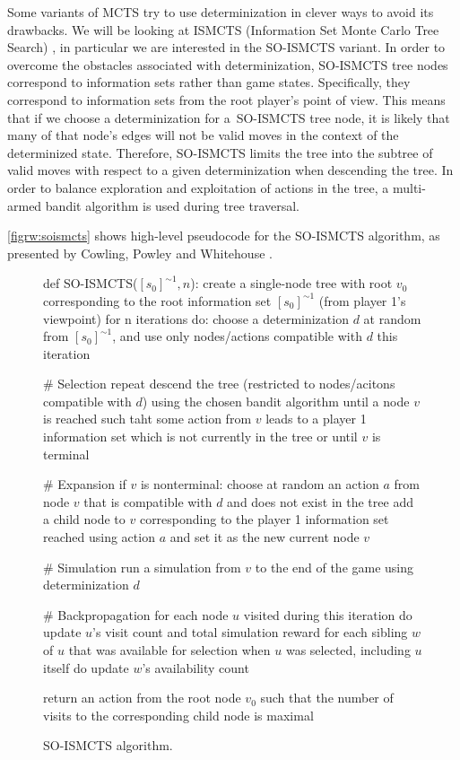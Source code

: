 Some variants of MCTS try to use determinization in clever ways to avoid its drawbacks.
We will be looking at ISMCTS (Information Set Monte Carlo Tree Search)
\cite{Cowling12}, in particular we are interested in the SO-ISMCTS variant.
In order to overcome the obstacles associated with determinization, SO-ISMCTS
tree nodes correspond to information sets rather than game states. Specifically,
they correspond to information sets from the root player's point of view. This
means that if we choose a determinization for a~SO-ISMCTS tree node, it is likely
that many of that node's edges will not be valid moves in the context
of the determinized state. Therefore, SO-ISMCTS limits the tree into the subtree
of valid moves with respect to a given determinization when descending the tree.
In order to balance exploration and exploitation of actions in the tree,
a multi-armed bandit algorithm is used during tree traversal.

\autoref{figrw:soismcts} shows high-level pseudocode for the SO-ISMCTS algorithm,
as presented by Cowling, Powley and Whitehouse \cite{Cowling12}.

\begin{figure}[h!]
\begin{code}[commandchars=\\\{\},codes={\catcode`\$=3\catcode`\^=7\catcode`\_=8}]
def SO-ISMCTS($[s_{0}]^{\sim1}, n$):
    create a single-node tree with root $v_{0}$ corresponding to the
        root information set $[s_{0}]^{\sim1}$ (from player 1's viewpoint)
    for n iterations do:
        choose a determinization $d$ at random from $[s_{0}]^{\sim1}$, and
        use only nodes/actions compatible with $d$ this iteration
        
        # Selection
        repeat
            descend the tree (restricted to nodes/acitons compatible 
            with $d$) using the chosen bandit algorithm
        until a node $v$ is reached such taht some action from $v$ leads
        to a player 1 information set which is not
        currently in the tree or until $v$ is terminal
        
        # Expansion
        if $v$ is nonterminal:
            choose at random an action $a$ from node $v$ that is
            compatible with $d$ and does not exist in the tree
            add a child node to $v$ corresponding to the player
            1 information set reached using action $a$ and set
            it as the new current node $v$

        # Simulation
        run a simulation from $v$ to the end of the game using
        determinization $d$

        # Backpropagation
        for each node $u$ visited during this iteration do
            update $u$'s visit count and total simulation reward
            for each sibling $w$ of $u$ that was available for
            selection when $u$ was selected, including $u$ itself do
                update $w$'s availability count

    return an action from the root node $v_{0}$ such that the
    number of visits to the corresponding child node is maximal
\end{code}
\caption{SO-ISMCTS algorithm.}\label{figrw:soismcts}
\end{figure}
